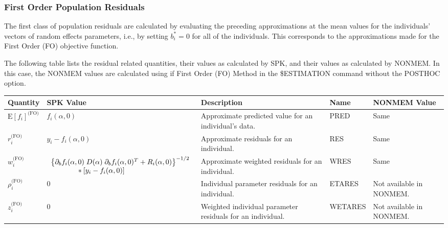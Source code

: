 \documentclass{article}
\begin{document}
\subsubsection{First Order Population Residuals}

The first class of population residuals are calculated by evaluating the
preceding approximations at the mean values for the individuals'
vectors of random effects parameters, i.e.,
by setting $b^{\ast}_i = 0$ for all of the individuals.
This corresponds to the approximations made for the First Order (FO)
objective function.

The following table lists the residual related quantities, their
values as calculated by SPK, and their values as calculated by NONMEM.
In this case, the NONMEM values are calculated using 
if First Order (FO) Method in the \$ESTIMATION command without 
the POSTHOC option.

\begin{center}
\begin{tabular}{|p{0.75in}|p{3.25in}|p{1.1in}|p{0.85in}|p{1.0in}|}
\hline
\hline
  {\bf Quantity}
    & {\bf SPK Value}
    & {\bf Description}
    & {\bf Name}
    & {\bf NONMEM Value} \\
  \hline
  \hline
  $\mbox{E} \left[ f_i \right]^{\mbox{(FO)}}$
    & $f_i(\alpha, 0)$
    & Approximate predicted value for an individual's data.
    & PRED 
    & Same \\
  \hline
  $r^{\mbox{(FO)}}_i$
    & $y_i - f_i(\alpha, 0)$
    & Approximate residuals for an individual.
    & RES 
    & Same \\
  \hline
  $w^{\mbox{(FO)}}_i$
    & $\begin{array}{l}
        \left\{ \partial_b f_i(\alpha, 0) \;
          D(\alpha) \; \partial_b f_i(\alpha, 0)^T
          + R_i(\alpha, 0) \right\}^{-1/2} \\
        \mbox{\hspace{0.5in}}
        \ast [ y_i - f_i(\alpha, 0) ]
      \end{array} $
    & Approximate weighted residuals for an individual.
    & WRES 
    & Same \\
  \hline
  $\rho^{\mbox{(FO)}}_i$
    & $0$
    & Individual parameter residuals for an individual.
    & ETARES
    & Not available in NONMEM. \\
  \hline
  $z^{\mbox{(FO)}}_i$
    & $0$
    & Weighted individual parameter residuals for an individual.
    & WETARES
    & Not available in NONMEM. \\
  \hline
  \hline
\end{tabular}
\end{center}
\end{document}
